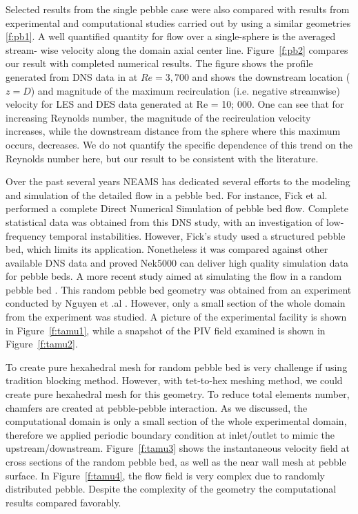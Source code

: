 Selected results from the single pebble case were also compared with results from experimental and computational studies carried out by using a similar geometries \ref{f:pb1}. A well quantified quantity for flow over a single-sphere is the averaged stream- wise velocity along the domain axial center line. Figure~\ref{f:pb2} compares our result with completed numerical results. The figure shows the profile generated from DNS data in \cite{fick2017investigation} at $Re = 3,700$ and shows the downstream location ($z=D$) and magnitude of the maximum recirculation (i.e. negative streamwise) velocity for LES and DES data generated at Re = 10; 000. One can see that for increasing Reynolds number, the magnitude of the recirculation velocity increases, while the downstream distance from the sphere where this maximum occurs, decreases. We do not quantify the specific dependence of this trend on the Reynolds number here, but our result to be consistent with the literature.

Over the past several years NEAMS has dedicated several efforts to the modeling and simulation of the detailed flow in a pebble bed. For instance, Fick et al. \cite{fick2017direct}  performed a complete Direct Numerical Simulation of pebble bed flow. Complete statistical data was obtained from this DNS study, with an investigation of low-frequency temporal instabilities. However, Fick's study \cite{fick2017direct} used a structured pebble bed, which limits its application. Nonetheless it was compared against other available DNS data and proved Nek5000 can deliver high quality simulation data for pebble beds. A more recent study aimed at simulating the flow in a random pebble bed \cite{yildiz2020direct}. This random pebble bed geometry was obtained from an experiment conducted by Nguyen et .al \cite{nguyen2018time}. However, only a small section of the whole domain from the experiment was studied. A picture of the experimental facility is shown in Figure~\ref{f:tamu1}, while a snapshot of the PIV field examined is shown in Figure~\ref{f:tamu2}.

To create pure hexahedral mesh for random pebble bed is very challenge if using tradition blocking method. However, with tet-to-hex meshing method, we could create pure hexahedral mesh for this geometry. To reduce total elements number, chamfers are created at pebble-pebble interaction. As we discussed, the computational domain is only a small section of the whole experimental domain, therefore we applied periodic boundary condition at inlet/outlet to mimic the upstream/downstream. Figure~\ref{f:tamu3} shows the instantaneous velocity field at cross sections of the random pebble bed, as well as the near wall mesh at pebble surface. In Figure~\ref{f:tamu4}, the flow field is very complex due to randomly distributed pebble. Despite the complexity of the geometry  the computational results compared favorably.

